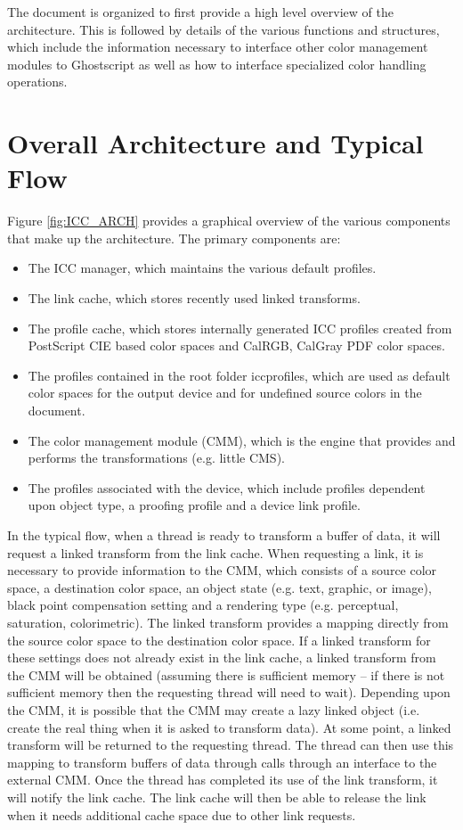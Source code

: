 \documentclass[12pt,notitlepage]{article}
\begin{document}
The document is organized to first provide a high level overview of the architecture. This is followed by details of the various functions and structures, which include the information necessary to interface other color management modules to Ghostscript as well as how to interface specialized color handling operations.

\section{Overall Architecture and Typical Flow}

Figure \ref{fig:ICC_ARCH} provides a graphical overview of the various components that make up the architecture.  The primary components are:
\begin{itemize}
\item  The ICC manager, which maintains the various default profiles.
\item The link cache, which stores recently used linked transforms.
\item The profile cache, which stores internally generated ICC profiles created from PostScript CIE based color spaces and CalRGB, CalGray PDF color spaces.
\item The profiles contained in the root folder iccprofiles, which are used as default color spaces for the output device and for undefined source colors in the document.
\item The color management module (CMM), which is the engine that provides and performs the transformations (e.g. little CMS).
\item The profiles associated with the device, which include profiles dependent upon object type, a proofing profile and a device link profile.
\end{itemize}
In the typical flow, when a thread is ready to transform a buffer of data, it will request a linked transform from the link cache. When requesting a link, it is necessary to provide information to the CMM, which consists of a source color space, a destination color space, an object state (e.g. text, graphic, or image), black point compensation setting and a rendering type (e.g. perceptual, saturation, colorimetric).  The linked transform provides a mapping directly from the source color space to the destination color space. If a linked transform for these settings does not already exist in the link cache, a linked transform from the CMM will be obtained (assuming there is sufficient memory -- if there is not sufficient memory then the requesting thread will need to wait).  Depending upon the CMM, it is possible that the CMM may create a lazy linked object (i.e. create the real thing when it is asked to transform data).  At some point, a linked transform will be returned to the requesting thread.  The thread can then use this mapping to transform buffers of data through calls through an interface to the external CMM.  Once the thread has completed its use of the link transform, it will notify the link cache.  The link cache will then be able to release the link when it needs additional cache space due to other link requests.
\end{document}
